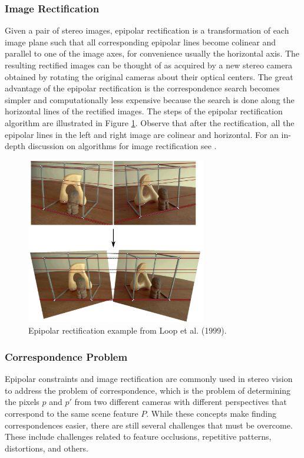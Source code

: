 \subsubsection{Image Rectification}
Given a pair of stereo images, epipolar rectification is a transformation of each image plane such that all corresponding epipolar lines become colinear and parallel to one of the image axes, for convenience usually the horizontal axis. The resulting rectified images can be thought of as acquired by a new stereo camera obtained by rotating the original cameras about their optical centers. The great advantage of the epipolar rectification is the correspondence search becomes simpler and computationally less expensive because the search is done along the horizontal lines of the rectified images. The steps of the epipolar rectification algorithm are illustrated in Figure \ref{fig:rect}. Observe that after the rectification, all the epipolar lines in the left and right image are colinear and horizontal.
For an in-depth discussion on algorithms for image rectification see \cite{Fusiello2000}\cite{LoopZhang1999}.
\begin{figure}[ht]
  \begin{center}
	\includegraphics[width=0.7\textwidth]{tex/figs/ch10_figs/rectification.png}  \end{center}
  \caption{Epipolar rectification example from Loop et al. (1999).}
  \label{fig:rect}
\end{figure}

\subsubsection{Correspondence Problem}
Epipolar constraints and image rectification are commonly used in stereo vision to address the problem of correspondence, which is the problem of determining the pixels $p$ and $p'$ from two different cameras with different perspectives that correspond to the same scene feature $P$. While these concepts make finding correspondences easier, there are still several challenges that must be overcome. These include challenges related to feature occlusions, repetitive patterns, distortions, and others.

